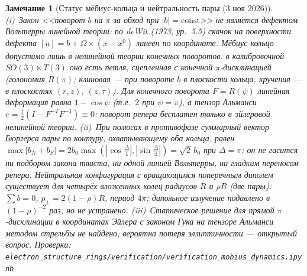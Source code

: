 \documentclass[12pt,a4paper]{article}
\newtheorem{remark}{Замечание}
\begin{document}
\begin{remark}[Статус мёбиус-кольца и нейтральность пары (3 ноя 2026)]
\label{rem:mobius_status}
(i)~Закон <<поворот $b$ на $\pi$ за обход при $|b|=\mathrm{const}$>> \emph{не} является
дефектом Вольтерры линейной теории: по deWit (1973, ур.~5.5) скачок на поверхности дефекта
$[u]=b+\Omega\times(x-x^0)$ линеен по координате. Мёбиус-кольцо допустимо лишь в нелинейной
теории конечных поворотов: в калибровочной $SO(3)\ltimes T(3)$ оно есть петля, сцепленная с конечной
$\pi$-дисклинацией (голономия $R(\pi)$; клиновая --- при повороте $b$ в плоскости кольца, кручения ---
в плоскостях $(r,z)$, $(z,\tau)$). Для конечного поворота $F=R(\psi)$ линейная деформация равна
$1-\cos\psi$ (т.е.~$2$ при $\psi=\pi$), а тензор Альманси $e=\tfrac12(I-F^{-T}F^{-1})\equiv0$:
поворот репера бесплатен только в эйлеровой нелинейной теории.
(ii)~При полюсах в противофазе суммарный вектор Бюргерса пары по контуру, охватывающему оба
кольца, равен $\max|b_N+b_S|=2b_0\max(|\cos\tfrac{\Delta}{4}|,|\sin\tfrac{\Delta}{4}|)=\sqrt2\,b_0$
при $\Delta=\pi$; он не гасится ни подбором закона твиста, ни одной линией Вольтерры, ни гладким
переносом репера. Нейтральная конфигурация с вращающимся поперечным диполем существует для
четырёх вложенных колец радиусов $R$ и $\rho R$ (две пары): $\sum b=0$,
$p_\perp=2(1-\rho)R$, период $4\pi$; дипольное излучение подавлено в $(1-\rho)^{-2}$ раз, но не устранено.
(iii)~Статическое решение для прямой $\pi$-дисклинации в координатах Эйлера с законом Гука на тензоре
Альманси методом стрельбы не найдено; вероятна потеря эллиптичности --- открытый вопрос.
Проверки: \texttt{electron\_structure\_rings/verification/verification\_mobius\_dynamics.ipynb}.
\end{remark}
\end{document}

